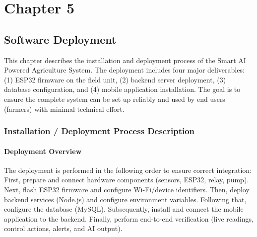




\setcounter{chapter}{5}
\setcounter{figure}{0}
\setcounter{table}{0}
\chapter*{Chapter 5}
\section{Software Deployment}

This chapter describes the installation and deployment process of the Smart AI Powered Agriculture System. The deployment includes four major deliverables: (1) ESP32 firmware on the field unit, (2) backend server deployment, (3) database configuration, and (4) mobile application installation. The goal is to ensure the complete system can be set up reliably and used by end users (farmers) with minimal technical effort.

\subsection{Installation / Deployment Process Description}
\label{sec:deployment-process}

\subsubsection{Deployment Overview}
The deployment is performed in the following order to ensure correct integration:
First, prepare and connect hardware components (sensors, ESP32, relay, pump). Next, flash ESP32 firmware and configure Wi-Fi/device identifiers. Then, deploy backend services (Node.js) and configure environment variables. Following that, configure the database (MySQL). Subsequently, install and connect the mobile application to the backend. Finally, perform end-to-end verification (live readings, control actions, alerts, and AI output).


